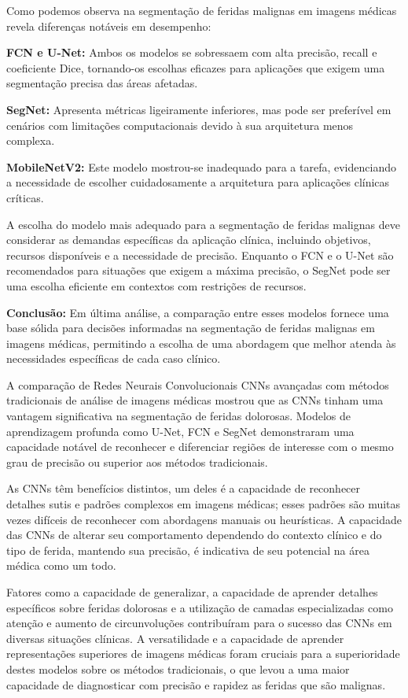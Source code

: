 Como podemos observa na segmentação de feridas malignas em imagens médicas revela diferenças notáveis em desempenho:

\textbf{\ac{FCN} e \ac{U-Net}:} Ambos os modelos se sobressaem com alta precisão, recall e coeficiente Dice, tornando-os escolhas eficazes para aplicações que exigem uma segmentação precisa das áreas afetadas.

\textbf{\ac{SegNet}:} Apresenta métricas ligeiramente inferiores, mas pode ser preferível em cenários com limitações computacionais devido à sua arquitetura menos complexa.

\textbf{\ac{MobileNetV2}:} Este modelo mostrou-se inadequado para a tarefa, evidenciando a necessidade de escolher cuidadosamente a arquitetura para aplicações clínicas críticas.

A escolha do modelo mais adequado para a segmentação de feridas malignas deve considerar as demandas específicas da aplicação clínica, incluindo objetivos, recursos disponíveis e a necessidade de precisão. Enquanto o \ac{FCN} e o \ac{U-Net} são recomendados para situações que exigem a máxima precisão, o \ac{SegNet} pode ser uma escolha eficiente em contextos com restrições de recursos.


\textbf{Conclusão:} Em última análise, a comparação entre esses modelos fornece uma base sólida para decisões informadas na segmentação de feridas malignas em imagens médicas, permitindo a escolha de uma abordagem que melhor atenda às necessidades específicas de cada caso clínico.

A comparação de Redes Neurais Convolucionais \ac{CNNs} avançadas com métodos tradicionais de análise de imagens médicas mostrou que as \ac{CNNs} tinham uma vantagem significativa na segmentação de feridas dolorosas. Modelos de aprendizagem profunda como \ac{U-Net}, \ac{FCN} e \ac{SegNet} demonstraram uma capacidade notável de reconhecer e diferenciar regiões de interesse com o mesmo grau de precisão ou superior aos métodos tradicionais.

As \ac{CNNs} têm benefícios distintos, um deles é a capacidade de reconhecer detalhes sutis e padrões complexos em imagens médicas; esses padrões são muitas vezes difíceis de reconhecer com abordagens manuais ou heurísticas. A capacidade das \ac{CNNs} de alterar seu comportamento dependendo do contexto clínico e do tipo de ferida, mantendo sua precisão, é indicativa de seu potencial na área médica como um todo.

Fatores como a capacidade de generalizar, a capacidade de aprender detalhes específicos sobre feridas dolorosas e a utilização de camadas especializadas como atenção e aumento de circunvoluções contribuíram para o sucesso das \ac{CNNs} em diversas situações clínicas. A versatilidade e a capacidade de aprender representações superiores de imagens médicas foram cruciais para a superioridade destes modelos sobre os métodos tradicionais, o que levou a uma maior capacidade de diagnosticar com precisão e rapidez as feridas que são malignas. \label{sec:perguntas}

